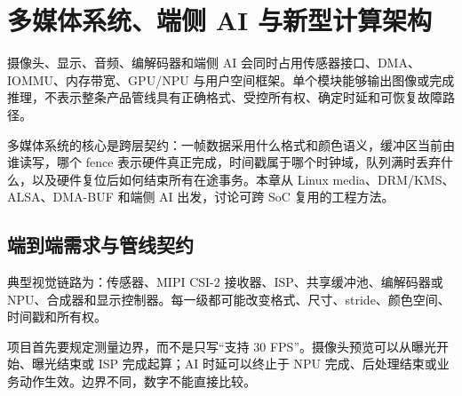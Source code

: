 \chapter{多媒体系统、端侧 AI 与新型计算架构}
\label{chap:multimedia-edge-architecture}

摄像头、显示、音频、编解码器和端侧 AI 会同时占用传感器接口、DMA、IOMMU、内存带宽、GPU/NPU 与用户空间框架。单个模块能够输出图像或完成推理，不表示整条产品管线具有正确格式、受控所有权、确定时延和可恢复故障路径。

多媒体系统的核心是跨层契约：一帧数据采用什么格式和颜色语义，缓冲区当前由谁读写，哪个 fence 表示硬件真正完成，时间戳属于哪个时钟域，队列满时丢弃什么，以及硬件复位后如何结束所有在途事务。本章从 Linux media、DRM/KMS、ALSA、DMA-BUF 和端侧 AI 出发，讨论可跨 SoC 复用的工程方法。

\section{端到端需求与管线契约}

典型视觉链路为：传感器、MIPI CSI-2 接收器、ISP、共享缓冲池、编解码器或 NPU、合成器和显示控制器。每一级都可能改变格式、尺寸、stride、颜色空间、时间戳和所有权。

\begin{center}
\end{center}

项目首先要规定测量边界，而不是只写“支持 30 FPS”。摄像头预览可以从曝光开始、曝光结束或 ISP 完成起算；AI 时延可以终止于 NPU 完成、后处理结束或业务动作生效。边界不同，数字不能直接比较。

